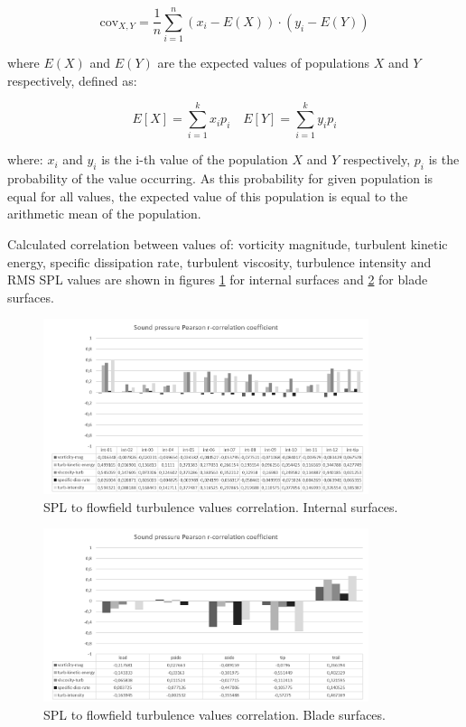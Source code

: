 \begin{equation} \label{eq:cov1}
\text{cov}_{X, Y} = \frac{1}{n} \sum_{i=1}^{n} \left(x_i - E \left( X \right) \right)\cdot \left(y_i - E \left( Y \right) \right)
\end{equation}

\noindent where $E(X)$ and $E(Y)$ are the expected values of populations $X$ and $Y$ respectively, defined as:

\begin{equation} \label{eq:exp1}
E \left[ X \right] = \sum_{i=1}^{k} x_i p_i \quad E \left[ Y \right] = \sum_{i=1}^{k} y_i p_i
\end{equation}

\noindent where: $x_i$ and $y_i$ is the i-th value of the population $X$ and $Y$ respectively, $p_i$ is the probability of the value occurring. As this probability for given population is equal for all values, the expected value of this population is equal to the arithmetic mean of the population.

Calculated correlation between values of: vorticity magnitude, turbulent kinetic energy, specific dissipation rate, turbulent viscosity, turbulence intensity and RMS SPL values are shown in figures \ref{spl_corr_int} for internal surfaces and \ref{spl_corr_blade} for blade surfaces.

\begin{figure}[h!]
\centering %
\includegraphics[width=0.85\textwidth]{Pictures/spl_pearson_int.png}
\caption{SPL to flowfield turbulence values correlation. Internal surfaces.}
\label{spl_corr_int}
\end{figure}

\begin{figure}[h!]
\centering %
\includegraphics[width=0.85\textwidth]{Pictures/spl_pearson_blade.png}
\caption{SPL to flowfield turbulence values correlation. Blade surfaces.}
\label{spl_corr_blade}
\end{figure}

